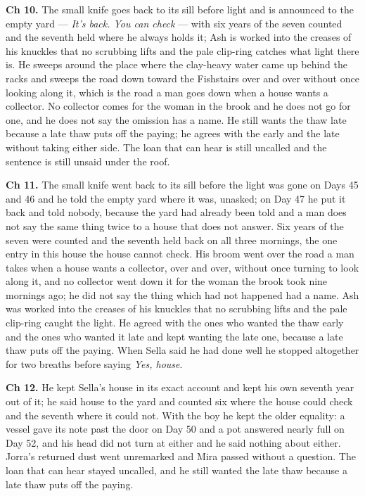 \documentclass{design/chronicle}
\begin{document}
{\textbf{Ch 10.} The small knife goes back to its sill before light and is announced to the empty yard --- \emph{It’s back. You can check} --- with six years of the seven counted and the seventh held where he always holds it; Ash is worked into the creases of his knuckles that no scrubbing lifts and the pale clip-ring catches what light there is. He sweeps around the place where the clay-heavy water came up behind the racks and sweeps the road down toward the Fishstairs over and over without once looking along it, which is the road a man goes down when a house wants a collector. No collector comes for the woman in the brook and he does not go for one, and he does not say the omission has a name. He still wants the thaw late because a late thaw puts off the paying; he agrees with the early and the late without taking either side. The loan that can hear is still uncalled and the sentence is still unsaid under the roof.

\textbf{Ch 11.} The small knife went back to its sill before the light was gone on Days 45 and 46 and he told the empty yard where it was, unasked; on Day 47 he put it back and told nobody, because the yard had already been told and a man does not say the same thing twice to a house that does not answer. Six years of the seven were counted and the seventh held back on all three mornings, the one entry in this house the house cannot check. His broom went over the road a man takes when a house wants a collector, over and over, without once turning to look along it, and no collector went down it for the woman the brook took nine mornings ago; he did not say the thing which had not happened had a name. Ash was worked into the creases of his knuckles that no scrubbing lifts and the pale clip-ring caught the light. He agreed with the ones who wanted the thaw early and the ones who wanted it late and kept wanting the late one, because a late thaw puts off the paying. When Sella said he had done well he stopped altogether for two breaths before saying \emph{Yes, house}.

\textbf{Ch 12.} He kept Sella’s house in its exact account and kept his own seventh year out of it; he said house to the yard and counted six where the house could check and the seventh where it could not. With the boy he kept the older equality: a vessel gave its note past the door on Day 50 and a pot answered nearly full on Day 52, and his head did not turn at either and he said nothing about either. Jorra’s returned dust went unremarked and Mira passed without a question. The loan that can hear stayed uncalled, and he still wanted the late thaw because a late thaw puts off the paying.

}
\end{document}
